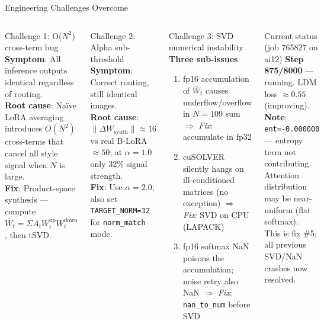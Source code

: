 \documentclass[aspectratio=169,10pt]{beamer}
\begin{document}
\begin{frame}[shrink=15]{Engineering Challenges Overcome}
  \begin{columns}[T]
      \begin{block}{Challenge 1: O($N^2$) cross-term bug}
        \textbf{Symptom}: All inference outputs identical regardless of routing.\\
        \textbf{Root cause}: Naïve LoRA averaging introduces $O(N^2)$ cross-terms that cancel all style signal when $N$ is large.\\
        \textbf{Fix}: Product-space synthesis — compute $\bar{W}_t = \Sigma A_i W_i^\text{up} W_i^\text{down}$, then tSVD.
      \end{block}
      \vspace{0.3em}
      \begin{block}{Challenge 2: Alpha sub-threshold}
        \textbf{Symptom}: Correct routing, still identical images.\\
        \textbf{Root cause}: $\|\Delta W_\text{synth}\| \approx 16$ vs real B-LoRA $\approx 50$; at $\alpha=1.0$ only 32\% signal strength.\\
        \textbf{Fix}: Use $\alpha = 2.0$; also set \texttt{TARGET\_NORM=32} for \texttt{norm\_match} mode.
      \end{block}

      \begin{block}{Challenge 3: SVD numerical instability}
        \textbf{Three sub-issues}:
        \begin{enumerate}
          \footnotesize
          \item fp16 accumulation of $\bar{W}_t$ causes underflow/overflow in $N\!=\!109$ sum $\Rightarrow$ \textit{Fix}: accumulate in fp32
          \item cuSOLVER silently hangs on ill-conditioned matrices (no exception) $\Rightarrow$ \textit{Fix}: SVD on CPU (LAPACK)
          \item fp16 softmax NaN poisons the accumulation; noise retry also NaN $\Rightarrow$ \textit{Fix}: \texttt{nan\_to\_num} before SVD
        \end{enumerate}
      \end{block}
      \vspace{0.3em}
      \begin{alertblock}{Current status (job 765827 on ai12)}
        \footnotesize
        \textbf{Step 875/8000} --- running. LDM loss $\approx 0.55$ (improving).\\[0.2em]
        \textbf{Note}: \texttt{ent=-0.000000} --- entropy term not contributing.\\Attention distribution may be near-uniform (flat softmax).\\This is fix \#5; all previous SVD/NaN crashes now resolved.
      \end{alertblock}
  \end{columns}
\end{frame}
\end{document}
